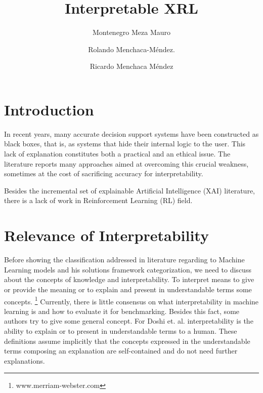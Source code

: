 \documentclass[runningheads]{llncs}
\begin{document}
%
\title{Interpretable XRL}

\author{Montenegro Meza Mauro  \and
Rolando Menchaca-Méndez. \and
Ricardo Menchaca Méndez}

%
\maketitle              
%
\begin{abstract}


\end{abstract}

\section{Introduction}

In recent years, many accurate decision support systems have been constructed as black boxes, that is, as systems that hide their internal logic to the user. This lack of explanation constitutes both a practical and an ethical issue. The literature reports many approaches aimed at overcoming this crucial weakness, sometimes at the cost of sacrificing accuracy for interpretability.

Besides the incremental set of explainable Artificial Intelligence (XAI) literature, there is a lack of work in Reinforcement Learning (RL) field.

\section{Relevance of Interpretability}

Before showing the classification addressed in literature regarding to Machine Learning models and his solutions framework categorization, we need to discuss about the concepts of knowledge and interpretability. To interpret means to give or provide the meaning or to explain and present in understandable terms some concepts. \footnote{www.merriam-webster.com} Currently, there is little consensus on what interpretability in machine learning is and how to evaluate it for benchmarking. Besides this fact, some authors try to give some general concept. For Doshi et. al. \cite{Doshi-velez2017}  interpretability is the ability to explain or to present in understandable terms to a human. These definitions assume implicitly that the concepts expressed in the understandable terms composing an explanation are self-contained and do not need further explanations. \cite{Guidotti2018}
\end{document}
